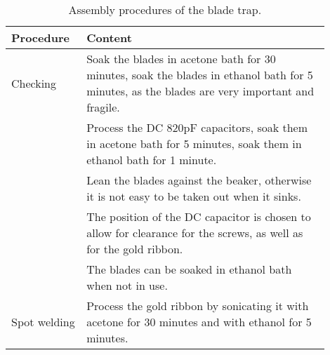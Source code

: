 \begin{table}
    \centering
    \caption{Assembly procedures of the blade trap.}
    \begin{tabular}{p{0.2\linewidth}p{0.7\linewidth}}
        \toprule
        Procedure    & Content                                                                                                                                                                                                                                                                    \\

        \midrule
        Checking     & Soak the blades in acetone bath for 30 minutes, soak the blades in ethanol bath for 5 minutes, as the blades are very important and fragile.                                                                                                                               \\
                     & Process the DC 820pF capacitors, soak them in acetone bath for 5 minutes, soak them in ethanol bath for 1 minute.                                                                                                                                                          \\
                     & Lean the blades against the beaker, otherwise it is not easy to be taken out when it sinks.                                                                                                                                                                                \\
                     & The position of the DC capacitor is chosen to allow for clearance for the screws, as well as for the gold ribbon.                                                                                                                                                          \\
                     & The blades can be soaked in ethanol bath when not in use.                                                                                                                                                                                                                  \\
        Spot welding & Process the gold ribbon by sonicating it with acetone for 30 minutes and with ethanol for 5 minutes.                                                                                                                                                                       \\

\end{tabular}
\end{table}
